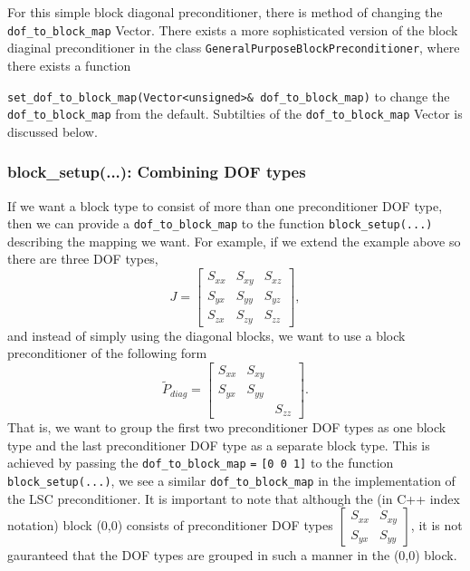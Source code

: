 For this simple block diagonal preconditioner, there is method of changing the \verb+dof_to_block_map+ Vector. There exists a more sophisticated version of the block diaginal preconditioner in the class \verb+GeneralPurposeBlockPreconditioner+, where there exists a function

\noindent\verb+set_dof_to_block_map(Vector<unsigned>& dof_to_block_map)+
to change the \verb+dof_to_block_map+ from the default. Subtilties of the \verb+dof_to_block_map+ Vector is discussed below.

\subsubsection{block\_setup(...): Combining DOF types\label{sec:block_setup_combining_dof_types}}
If we want a block type to consist of more than one preconditioner DOF type, then we can provide a \verb+dof_to_block_map+ to the function \verb+block_setup(...)+ describing the mapping we want. For example, if we extend the example above so there are three DOF types,
\begin{equation*}
J =
\begin{bmatrix}
S_{xx}&S_{xy}&S_{xz} \\
S_{yx}&S_{yy}&S_{yz} \\
S_{zx}&S_{zy}&S_{zz}
\end{bmatrix},
\end{equation*}
and instead of simply using the diagonal blocks, we want to use a block preconditioner of the following form
\begin{equation*}
\tilde{P}_{diag} =
\begin{bmatrix}
S_{xx}&S_{xy}&       \\
S_{yx}&S_{yy}&       \\
      &      &S_{zz}
\end{bmatrix}.
\end{equation*}
That is, we want to group the first two preconditioner DOF types as one block type and the last preconditioner DOF type as a separate block type. This is achieved by passing the \verb+dof_to_block_map+ \verb+=+ \verb+[0 0 1]+ to the function \verb+block_setup(...)+, we see a similar \verb+dof_to_block_map+ in the implementation of the LSC preconditioner. It is important to note that although the (in C++ index notation) block (0,0) consists of preconditioner DOF types 
$\displaystyle
\begin{bmatrix}
S_{xx}&S_{xy} \\
S_{yx}&S_{yy} 
\end{bmatrix}
$, it is not gauranteed that the DOF types are grouped in such a manner in the (0,0) block.

